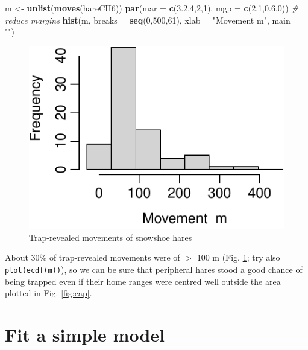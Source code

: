 \documentclass[
]{book}
\newenvironment{Shaded}{\begin{snugshade}}{\end{snugshade}}
\newcommand{\AttributeTok}[1]{\textcolor[rgb]{0.13,0.29,0.53}{#1}}
\newcommand{\CommentTok}[1]{\textcolor[rgb]{0.56,0.35,0.01}{\textit{#1}}}
\newcommand{\DecValTok}[1]{\textcolor[rgb]{0.00,0.00,0.81}{#1}}
\newcommand{\FloatTok}[1]{\textcolor[rgb]{0.00,0.00,0.81}{#1}}
\newcommand{\FunctionTok}[1]{\textcolor[rgb]{0.13,0.29,0.53}{\textbf{#1}}}
\newcommand{\NormalTok}[1]{#1}
\newcommand{\OtherTok}[1]{\textcolor[rgb]{0.56,0.35,0.01}{#1}}
\newcommand{\StringTok}[1]{\textcolor[rgb]{0.31,0.60,0.02}{#1}}
\begin{document}
\begin{Shaded}
\begin{Highlighting}[]
\NormalTok{m }\OtherTok{\textless{}{-}} \FunctionTok{unlist}\NormalTok{(}\FunctionTok{moves}\NormalTok{(hareCH6))}
\FunctionTok{par}\NormalTok{(}\AttributeTok{mar =} \FunctionTok{c}\NormalTok{(}\FloatTok{3.2}\NormalTok{,}\DecValTok{4}\NormalTok{,}\DecValTok{2}\NormalTok{,}\DecValTok{1}\NormalTok{), }\AttributeTok{mgp =} \FunctionTok{c}\NormalTok{(}\FloatTok{2.1}\NormalTok{,}\FloatTok{0.6}\NormalTok{,}\DecValTok{0}\NormalTok{))  }\CommentTok{\# reduce margins}
\FunctionTok{hist}\NormalTok{(m, }\AttributeTok{breaks =} \FunctionTok{seq}\NormalTok{(}\DecValTok{0}\NormalTok{,}\DecValTok{500}\NormalTok{,}\DecValTok{61}\NormalTok{), }\AttributeTok{xlab =} \StringTok{"Movement  m"}\NormalTok{, }\AttributeTok{main =} \StringTok{""}\NormalTok{)}
\end{Highlighting}
\end{Shaded}

\begin{figure}

{\centering \includegraphics{SECRbook_files/figure-latex/moves-1} 

}

\caption{Trap-revealed movements of snowshoe hares}\label{fig:moves}
\end{figure}

About 30\% of trap-revealed movements were of \(>\) 100 m (Fig. \ref{fig:moves}; try also \texttt{plot(ecdf(m))}), so we can be sure that peripheral hares stood a good chance of being trapped even if their home ranges were centred well outside the area plotted in Fig. \ref{fig:cap}.

\section{Fit a simple model}\label{fit-a-simple-model}
\end{document}
